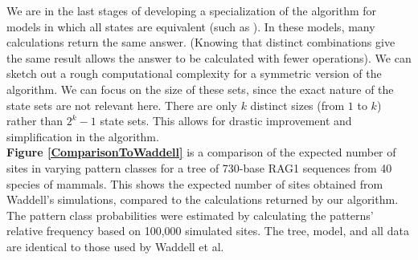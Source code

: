 \documentclass[a0paper,landscape]{baposter}
\begin{document}
\begin{poster}
{We are in the last stages of developing a specialization of the algorithm for models in which all states are equivalent (such as \citep{Lewis2001}).
In these models, many calculations return the same answer. (Knowing that distinct combinations give the same result allows the answer to be calculated with fewer operations). 
We can sketch out a rough computational complexity for a symmetric version of the algorithm.
We can focus on the size of these sets, since the exact nature of the state sets are not relevant here.  
There are only $k$ distinct sizes (from $1$ to $k$) rather than $2^{k}-1$ state sets.
This allows for drastic improvement and simplification in the algorithm.\\
{\bf Figure \ref{ComparisonToWaddell}} is a comparison of the expected number of sites in varying pattern classes for a tree of 730-base RAG1 sequences from 40 species of mammals.  This shows the expected number of sites obtained from Waddell's simulations, compared to the calculations returned by our algorithm.  The pattern class probabilities were estimated by calculating the patterns' relative frequency based on 100,000 simulated sites.  The tree, model, and all data are identical to those used by Waddell et al.

}
\end{poster}
\end{document}
